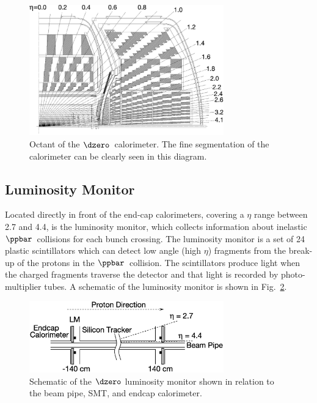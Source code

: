 \begin{figure}[!h!tbp]
\begin{center}
\includegraphics[width=0.75\textwidth]{eps/D0/CalorimeterSegmentation2.eps}
\end{center}
\vspace{-0.1in}
\caption{Octant of the $\dzero$~calorimeter. The fine segmentation of the calorimeter can be clearly seen in this diagram.}
\label{CalorimeterSegmentation}
\end{figure}



\subsection{Luminosity Monitor}
\label{luminositydetector}

Located directly in front of the end-cap calorimeters, covering a $\eta$ range between 2.7 and 4.4, is the luminosity monitor, which collects information about inelastic $\ppbar$~collisions for each bunch crossing. The luminosity monitor is a set of 24 plastic scintillators which can detect low angle (high $\eta$) fragments from the break-up of the protons in the $\ppbar$~collision. The scintillators produce light when the charged fragments traverse the detector and that light is recorded by photo-multiplier tubes. A schematic of the luminosity monitor is shown in Fig.~\ref{Luminosity}.

\begin{figure}[!h!tbp]
\begin{center}
\includegraphics[width=0.75\textwidth]{eps/D0/Luminosity.eps}
\end{center}
\vspace{-0.1in}
\caption{Schematic of the $\dzero$ luminosity monitor shown in relation to the beam pipe, SMT, and endcap calorimeter.}
\label{Luminosity}
\end{figure}


